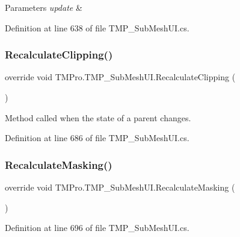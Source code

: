 \begin{DoxyParams}{Parameters}
{\em update} & \\
\hline
\end{DoxyParams}


Definition at line 638 of file T\+M\+P\+\_\+\+Sub\+Mesh\+U\+I.\+cs.

\mbox{\label{class_t_m_pro_1_1_t_m_p___sub_mesh_u_i_a6505e4b6f7c11eeb4ea155d7d6ef4248}} 
\subsubsection{\texorpdfstring{RecalculateClipping()}{RecalculateClipping()}}
{\footnotesize\ttfamily override void T\+M\+Pro.\+T\+M\+P\+\_\+\+Sub\+Mesh\+U\+I.\+Recalculate\+Clipping (\begin{DoxyParamCaption}{ }\end{DoxyParamCaption})}



Method called when the state of a parent changes. 



Definition at line 686 of file T\+M\+P\+\_\+\+Sub\+Mesh\+U\+I.\+cs.

\mbox{\label{class_t_m_pro_1_1_t_m_p___sub_mesh_u_i_a6f662a8acac8a908a79012344a8e2330}} 
\subsubsection{\texorpdfstring{RecalculateMasking()}{RecalculateMasking()}}
{\footnotesize\ttfamily override void T\+M\+Pro.\+T\+M\+P\+\_\+\+Sub\+Mesh\+U\+I.\+Recalculate\+Masking (\begin{DoxyParamCaption}{ }\end{DoxyParamCaption})}







Definition at line 696 of file T\+M\+P\+\_\+\+Sub\+Mesh\+U\+I.\+cs.

